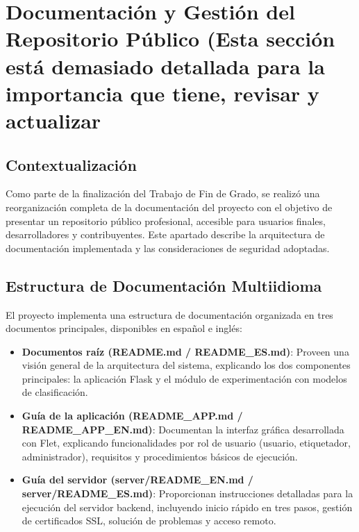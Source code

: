 \documentclass[12pt,a4paper]{article}
\begin{document}
\section{Documentación y Gestión del Repositorio Público (Esta sección está demasiado detallada para la importancia que tiene, revisar y actualizar}
\label{sec:documentacion_repositorio}

\subsection{Contextualización}

Como parte de la finalización del Trabajo de Fin de Grado, se realizó una reorganización completa de la documentación del proyecto con el objetivo de presentar un repositorio público profesional, accesible para usuarios finales, desarrolladores y contribuyentes. Este apartado describe la arquitectura de documentación implementada y las consideraciones de seguridad adoptadas.

\subsection{Estructura de Documentación Multiidioma}

El proyecto implementa una estructura de documentación organizada en tres documentos principales, disponibles en español e inglés:

\begin{itemize}
    \item \textbf{Documentos raíz (README.md / README\_ES.md)}: Proveen una visión general de la arquitectura del sistema, explicando los dos componentes principales: la aplicación Flask y el módulo de experimentación con modelos de clasificación.
    
    \item \textbf{Guía de la aplicación (README\_APP.md / README\_APP\_EN.md)}: Documentan la interfaz gráfica desarrollada con Flet, explicando funcionalidades por rol de usuario (usuario, etiquetador, administrador), requisitos y procedimientos básicos de ejecución.
    
    \item \textbf{Guía del servidor (server/README_EN.md / server/README\_ES.md)}: Proporcionan instrucciones detalladas para la ejecución del servidor backend, incluyendo inicio rápido en tres pasos, gestión de certificados SSL, solución de problemas y acceso remoto.
\end{itemize}
\end{document}
